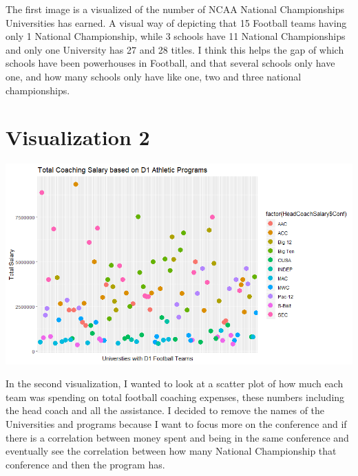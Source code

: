 \documentclass{article}
\begin{document}
The first image is a visualized of the number of NCAA National Championships Universities has earned. A visual way of depicting that 15 Football teams having only 1 National Championship, while 3 schools have 11 National Championships and only one University has 27 and 28 titles. I think this helps the gap of which schools have been powerhouses in Football, and that several schools only have one, and how many schools only have like one, two and three national championships. 

\section{Visualization 2}
\includegraphics[scale=.75]{PS6b_Yarberry.png}

In the second visualization, I wanted to look at a scatter plot of how much each team was spending on total football coaching expenses, these numbers including the head coach and all the assistance. I decided to remove the names of the Universities and programs because I want to focus more on the conference and if there is a correlation between money spent and being in the same conference and eventually see the correlation between how many National Championship that conference and then the program has. 
\end{document}
